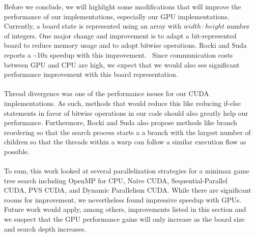Before we conclude, we will highlight some modifications that will improve the performance of our implementations, especially our GPU implementations. Currently, a board state is represented using an array with $width\cdot height$ number of integers. One major change and improvement is to adapt a bit-represented board to reduce memory usage and to adopt bitwise operations. Rocki and Suda reports a \textasciitilde10x speedup with this improvement.~\cite{Rocki} Since communication costs between GPU and CPU are high, we expect that we would also see significant performance improvement with this board representation.\\
\\
Thread divergence was one of the performance issues for our CUDA implementations. As such, methods that would reduce this like reducing if-else statements in favor of bitwise operations in our code should also greatly help our performance. Furthermore, Rocki and Suda also propose methods like branch reordering so that the search process starts a a branch with the largest number of children so that the threads within a warp can follow a similar execution flow as possible.\cite{Rocki}\\
\\
To sum, this work looked at several parallelization strategies for a minimax game tree search including OpenMP for CPU, Naive CUDA, Sequential-Parallel CUDA, PVS CUDA, and Dynamic Parallelism CUDA. While there are significant rooms for improvement, we nevertheless found impressive speedup with GPUs. Future work would apply, among others, improvements listed in this section and we suspect that the GPU performance gains will only increase as the board size and search depth increases. 

